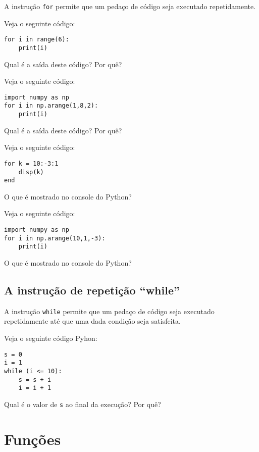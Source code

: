 A instrução \verb+for+ permite que um pedaço de código seja executado repetidamente.

\begin{ex}
  Veja o seguinte código:
\begin{verbatim}
for i in range(6):
    print(i)
\end{verbatim}
Qual é a saída deste código? Por quê?
\end{ex}

\begin{ex}
  Veja o seguinte código:
\begin{verbatim}
import numpy as np
for i in np.arange(1,8,2):
    print(i)
\end{verbatim}
Qual é a saída deste código? Por quê?
\end{ex}

\begin{ex}
  Veja o seguinte código:
\begin{verbatim}
for k = 10:-3:1
    disp(k)
end
\end{verbatim}
O que é mostrado no console do Python?
\end{ex}

\begin{ex}
  Veja o seguinte código:
\begin{verbatim}
import numpy as np
for i in np.arange(10,1,-3):
    print(i)
\end{verbatim}
O que é mostrado no console do Python?
\end{ex}

\subsection{A instrução de repetição ``while''}

A instrução \verb+while+ permite que um pedaço de código seja executado repetidamente até que uma dada condição seja satisfeita.

\begin{ex}
Veja o seguinte código Pyhon:
\begin{verbatim}
s = 0
i = 1
while (i <= 10):
    s = s + i
    i = i + 1
\end{verbatim}
Qual é o valor de \verb+s+ ao final da execução? Por quê?
\end{ex}

\section{Funções}

